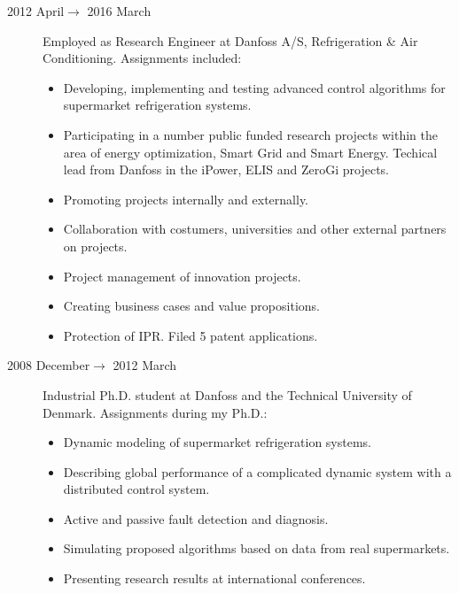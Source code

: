 \documentclass[margin,line,a4paper]{resume}
\begin{document}
\begin{resume}
\begin{description}
    \item[2012 April$\rightarrow$ 2016 March] Employed as Research Engineer at Danfoss A/S, Refrigeration \& Air Conditioning. Assignments included:
      \begin{itemize}
      \item Developing, implementing and testing advanced control algorithms for supermarket refrigeration systems.
      \item Participating in a number public funded research projects within the area of energy optimization, Smart Grid and Smart Energy. Techical lead from Danfoss in the iPower, ELIS and ZeroGi projects.
      \item Promoting projects internally and externally.
      \item Collaboration with costumers, universities and other external partners on projects.
      \item Project management of innovation projects.
      \item Creating business cases and value propositions.
      \item Protection of IPR. Filed 5 patent applications.
      \end{itemize}

    \item[2008 December$\rightarrow$ 2012 March] Industrial Ph.D. student at Danfoss and the Technical University of Denmark. Assignments during my Ph.D.:
      \begin{itemize}
      \item Dynamic modeling of supermarket refrigeration systems.
      \item Describing global performance of a complicated dynamic system with a distributed control system.
      \item Active and passive fault detection and diagnosis.
      \item Simulating proposed algorithms based on data from real supermarkets.
      \item Presenting research results at international conferences.
      \end{itemize}


\end{description}
\end{resume}
\end{document}
